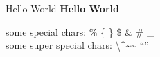 \documentclass[oneside,final,14pt]{extreport}
\begin{document}
Hello World\newline
\textbf{Hello World}\newline

some special chars: \% \{ \} \$ \& \# \_ \\
some super special chars: \textbackslash  \textasciicircum  \textasciitilde \~{}  ``'' \\
\end{document}
